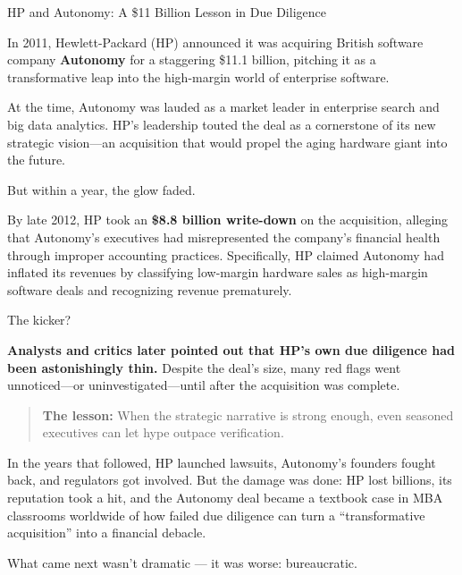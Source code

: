 \begin{HistoricalSidebar}{HP and Autonomy: A \$11 Billion Lesson in Due Diligence}

    In 2011, Hewlett-Packard (HP) announced it was acquiring British software company \textbf{Autonomy} for a staggering \$11.1 billion, pitching it as a transformative leap into the high-margin world of enterprise software.
    
    At the time, Autonomy was lauded as a market leader in enterprise search and big data analytics. HP’s leadership touted the deal as a cornerstone of its new strategic vision—an acquisition that would propel the aging hardware giant into the future.
    
    But within a year, the glow faded.
    
    \medskip
    
    By late 2012, HP took an \textbf{\$8.8 billion write-down} on the acquisition, alleging that Autonomy’s executives had misrepresented the company’s financial health through improper accounting practices.
    Specifically, HP claimed Autonomy had inflated its revenues by classifying low-margin hardware sales as high-margin software deals and recognizing revenue prematurely.
    
    \medskip
    
    The kicker?
    
    \textbf{Analysts and critics later pointed out that HP’s own due diligence had been astonishingly thin.}
    Despite the deal’s size, many red flags went unnoticed—or uninvestigated—until after the acquisition was complete.
    
    \medskip
    
    \begin{quote}
    \textbf{The lesson:} When the strategic narrative is strong enough, even seasoned executives can let hype outpace verification.
    \end{quote}
    
    In the years that followed, HP launched lawsuits, Autonomy’s founders fought back, and regulators got involved. But the damage was done:
    HP lost billions, its reputation took a hit, and the Autonomy deal became a textbook case in MBA classrooms worldwide of how failed due diligence can turn a “transformative acquisition” into a financial debacle.
    
\end{HistoricalSidebar}

What came next wasn’t dramatic — it was worse: bureaucratic.

